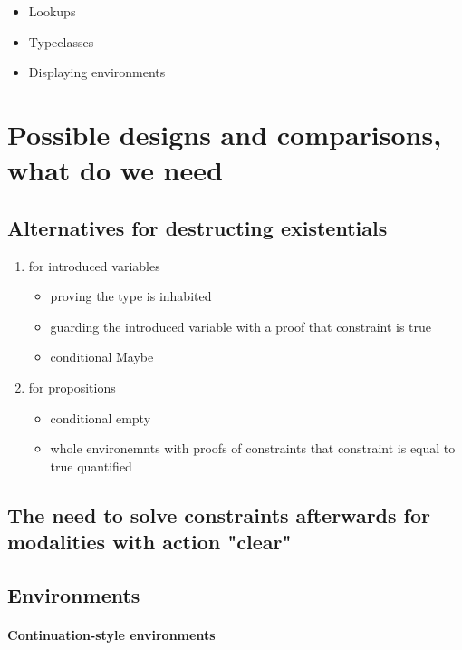 \begin{itemize}
\item Lookups
\item Typeclasses
\item Displaying environments
\end{itemize}




\section{Possible designs and comparisons, what do we need}

\subsection{Alternatives for destructing existentials}
\label{subsec:design_decisions_existential}


\begin{enumerate}
\item for introduced variables

\begin{itemize}
\item proving the type is inhabited
\item guarding the introduced variable with a proof that constraint is true
\item conditional Maybe
\end{itemize}
\item for propositions

\begin{itemize}
\item conditional empty
\item whole environemnts with proofs of constraints that constraint is equal to true quantified
\end{itemize}
\end{enumerate}

\subsection{The need to solve constraints afterwards for modalities with action "clear"}

\subsection{Environments}

\paragraph{Continuation-style environments}

